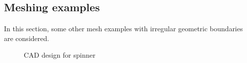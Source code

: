 \subsection{Meshing examples}
\paragraph{}
In this section, some other mesh examples with irregular geometric boundaries are considered.

\begin{figure}
    \centering
    \caption[CAD design for spinner]{CAD design for spinner}
    \label{oct_ex:mesh_spinner_cad}
\end{figure}


